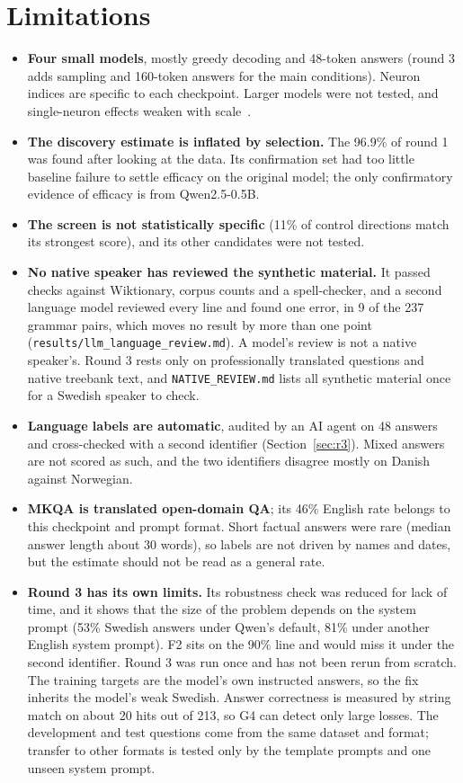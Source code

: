 \documentclass[10pt,a4paper]{article}
\newcommand{\code}[1]{{\small\texttt{#1}}}
\begin{document}
\section{Limitations}
\begin{itemize}
\item \textbf{Four small models}, mostly greedy decoding and 48-token answers (round 3 adds sampling and 160-token answers for the main conditions). Neuron indices are specific to each checkpoint. Larger models were not tested, and single-neuron effects weaken with scale~\cite{gurnee2023}.
\item \textbf{The discovery estimate is inflated by selection.} The 96.9\% of round 1 was found after looking at the data. Its confirmation set had too little baseline failure to settle efficacy on the original model; the only confirmatory evidence of efficacy is from Qwen2.5-0.5B.
\item \textbf{The screen is not statistically specific} (11\% of control directions match its strongest score), and its other candidates were not tested.
\item \textbf{No native speaker has reviewed the synthetic material.} It passed checks against Wiktionary, corpus counts and a spell-checker, and a second language model reviewed every line and found one error, in 9 of the 237 grammar pairs, which moves no result by more than one point (\code{results/llm\_language\_review.md}). A model's review is not a native speaker's. Round 3 rests only on professionally translated questions and native treebank text, and \code{NATIVE\_REVIEW.md} lists all synthetic material once for a Swedish speaker to check.
\item \textbf{Language labels are automatic}, audited by an AI agent on 48 answers and cross-checked with a second identifier (Section~\ref{sec:r3}). Mixed answers are not scored as such, and the two identifiers disagree mostly on Danish against Norwegian.
\item \textbf{MKQA is translated open-domain QA}; its 46\% English rate belongs to this checkpoint and prompt format. Short factual answers were rare (median answer length about 30 words), so labels are not driven by names and dates, but the estimate should not be read as a general rate.
\item \textbf{Round 3 has its own limits.} Its robustness check was reduced for lack of time, and it shows that the size of the problem depends on the system prompt (53\% Swedish answers under Qwen's default, 81\% under another English system prompt). F2 sits on the 90\% line and would miss it under the second identifier. Round 3 was run once and has not been rerun from scratch. The training targets are the model's own instructed answers, so the fix inherits the model's weak Swedish. Answer correctness is measured by string match on about 20 hits out of 213, so G4 can detect only large losses. The development and test questions come from the same dataset and format; transfer to other formats is tested only by the template prompts and one unseen system prompt.
\end{itemize}
\end{document}
